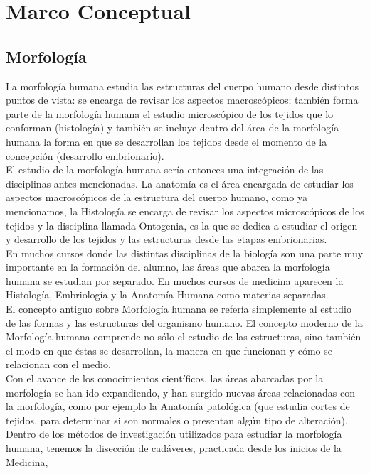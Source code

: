 \chapter{Marco Conceptual}

\section{Morfología}
La morfología humana estudia las estructuras del cuerpo humano desde distintos puntos de vista: se encarga de revisar los aspectos macroscópicos; 
también forma parte de la morfología humana el estudio microscópico de los tejidos que lo conforman (histología) y también se incluye dentro del 
área de la morfología humana la forma en que se desarrollan los tejidos desde el momento de la concepción (desarrollo embrionario).\\
El estudio de la morfología humana sería entonces una integración de las disciplinas antes mencionadas. La anatomía es el área encargada de estudiar los 
aspectos macroscópicos de la estructura del cuerpo humano, como ya mencionamos, la Histología se encarga de revisar los aspectos microscópicos de los tejidos 
y la disciplina llamada Ontogenia, es la que se dedica a estudiar el origen y desarrollo de los tejidos y las estructuras desde las etapas embrionarias.\\
En muchos cursos donde las distintas disciplinas de la biología  son una parte muy importante en la formación del alumno, las áreas que abarca la morfología 
humana se estudian por separado. En muchos cursos de medicina aparecen la Histología, Embriología y la Anatomía Humana como materias separadas.\\
El concepto antiguo sobre Morfología humana se refería simplemente al estudio de las formas y  las estructuras del organismo humano. 
El concepto moderno de la Morfología humana comprende no sólo el estudio de las estructuras, sino también el modo en que éstas se desarrollan, 
la manera en que funcionan y cómo se relacionan con el medio.\\
Con el avance de los conocimientos científicos, las áreas abarcadas por la morfología se han ido expandiendo, y han surgido nuevas áreas relacionadas con la morfología, 
como por ejemplo la Anatomía patológica (que estudia cortes de tejidos, para determinar  si son normales o presentan algún tipo de alteración).\\
Dentro de los métodos de investigación utilizados para estudiar la morfología humana, tenemos la disección de cadáveres, practicada desde los inicios de la Medicina, 
